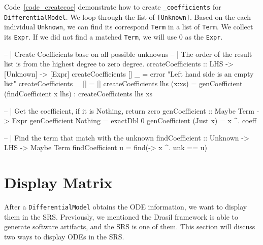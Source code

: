 Code~\ref{code_createcoe} demonstrate how to create \verb|_coefficients| for \verb|DifferentialModel|. We loop through the list of \verb|[Unknown]|. Based on the each individual \verb|Unknown|, we can find its correspond \verb|Term| in a list of \verb|Term|. We collect its \verb|Expr|. If we did not find a matched \verb|Term|, we will use 0 as the \verb|Expr|.

\begin{listing}[ht]
\begin{haskell1}
-- | Create Coefficients base on all possible unknowns
-- | The order of the result list is from the highest degree to zero degree.
createCoefficients :: LHS -> [Unknown] -> [Expr]
createCoefficients [] _ = error "Left hand side is an empty list"
createCoefficients _ [] = []
createCoefficients lhs (x:xs) = genCoefficient (findCoefficient x lhs) : createCoefficients lhs xs

-- | Get the coefficient, if it is Nothing, return zero
genCoefficient :: Maybe Term -> Expr
genCoefficient Nothing = exactDbl 0
genCoefficient (Just x) = x ^. coeff

-- | Find the term that match with the unknown
findCoefficient :: Unknown -> LHS -> Maybe Term
findCoefficient u = find(\x -> x ^. unk == u)
\end{haskell1}
\label{code_createcoe}
\end{listing}

\section{Display Matrix}
After a \verb|DifferentialModel| obtains the ODE information, we want to display them in the SRS. Previously, we mentioned the Drasil framework is able to generate software artifacts, and the SRS is one of them. This section will discuss two ways to display ODEs in the SRS.

